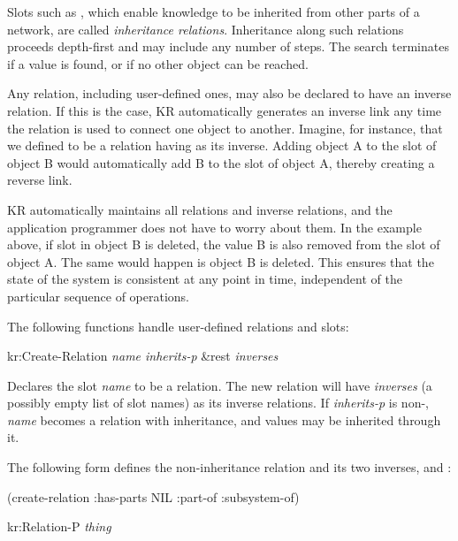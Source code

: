 Slots such as , which enable knowledge to be inherited from
other parts of a network, are called {\it inheritance relations}.
Inheritance along such relations proceeds depth-first
 and may include any number of steps.  The
search terminates if a value is found, or if no other object can be
reached.

Any relation, including user-defined ones, may also be declared to have an
inverse relation.  If this is the case, KR
automatically generates an inverse link any time the relation is used to
connect one object to another.  Imagine, for instance, that we defined
 to be a relation having  as its inverse.  Adding
object A to the slot  of object B would automatically add B to
the slot  of object A, thereby creating a reverse link.

KR automatically maintains all relations and
inverse relations, and the application programmer does not
have to worry about them.  In the example above, if slot 
in object B is deleted, the value B is also removed from the slot
 of object A.  The same would happen is object B is deleted.
This ensures that the state of the system is consistent at any
point in time, independent of the particular sequence of operations.


The following functions handle user-defined relations and slots:

\value{f-top}
\begin{example}
kr:Create-Relation {\it name inherits-p} \&rest {\it inverses}\value{Macro}
\end{example}

Declares the slot {\it name} to be a
relation.  The new relation will have {\it inverses} (a possibly empty
list of slot names)
as its inverse relations.  If {\it inherits-p} is
non-\value{nil}, {\it name} becomes a relation with inheritance, and
values may be inherited through it.

The following form defines the non-inheritance relation
 and its two inverses,  and :
\begin{programexample}
(create-relation :has-parts NIL :part-of :subsystem-of)
\end{programexample}



\value{f-top}
\begin{example}
kr:Relation-P {\it thing}\value{Macro}
\end{example}

